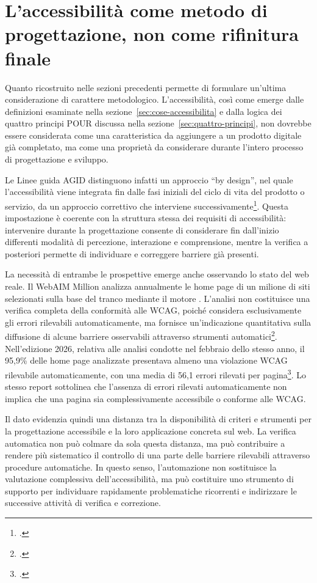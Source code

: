 \section{L'accessibilità come metodo di progettazione, non come rifinitura finale}

\label{sec:accessibilita-by-design}

Quanto ricostruito nelle sezioni precedenti permette di formulare un'ultima considerazione di carattere metodologico. L'accessibilità, così come emerge dalle definizioni esaminate nella sezione~\ref{sec:cose-accessibilita} e dalla logica dei quattro principi POUR discussa nella sezione~\ref{sec:quattro-principi}, non dovrebbe essere considerata come una caratteristica da aggiungere a un prodotto digitale già completato, ma come una proprietà da considerare durante l'intero processo di progettazione e sviluppo.

Le Linee guida AGID distinguono infatti un approccio \enquote{by design}, nel quale l'accessibilità viene integrata fin dalle fasi iniziali del ciclo di vita del prodotto o servizio, da un approccio correttivo che interviene successivamente\footcite[§~6.2]{agid:lg-82-2022}. Questa impostazione è coerente con la struttura stessa dei requisiti di accessibilità: intervenire durante la progettazione consente di considerare fin dall'inizio differenti modalità di percezione, interazione e comprensione, mentre la verifica a posteriori permette di individuare e correggere barriere già presenti.

La necessità di entrambe le prospettive emerge anche osservando lo stato del web reale. Il WebAIM Million analizza annualmente le home page di un milione di siti selezionati sulla base del \gls{tranco} mediante il motore . L'analisi non costituisce una verifica completa della conformità alle WCAG, poiché considera esclusivamente gli errori rilevabili automaticamente, ma fornisce un'indicazione quantitativa sulla diffusione di alcune barriere osservabili attraverso strumenti automatici\footcite{webaim:million2026}. Nell'edizione 2026, relativa alle analisi condotte nel febbraio dello stesso anno, il 95,9\% delle home page analizzate presentava almeno una violazione WCAG rilevabile automaticamente, con una media di 56,1 errori rilevati per pagina\footcite{webaim:million2026}. Lo stesso report sottolinea che l'assenza di errori rilevati automaticamente non implica che una pagina sia complessivamente accessibile o conforme alle WCAG.

Il dato evidenzia quindi una distanza tra la disponibilità di criteri e strumenti per la progettazione accessibile e la loro applicazione concreta sul web. La verifica automatica non può colmare da sola questa distanza, ma può contribuire a rendere più sistematico il controllo di una parte delle barriere rilevabili attraverso procedure automatiche. In questo senso, l'automazione non sostituisce la valutazione complessiva dell'accessibilità, ma può costituire uno strumento di supporto per individuare rapidamente problematiche ricorrenti e indirizzare le successive attività di verifica e correzione.

